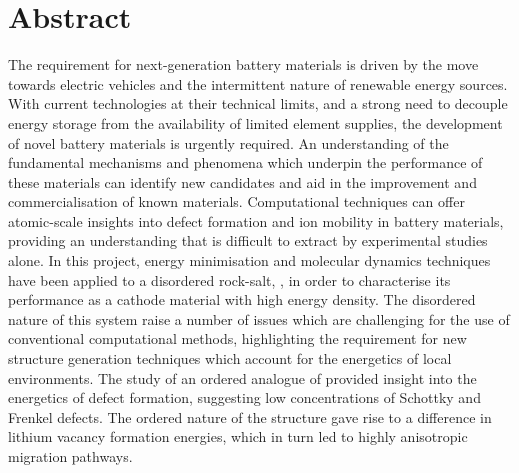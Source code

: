 \chapter*{Abstract}
The requirement for next-generation battery materials is driven by the move towards electric vehicles and the intermittent nature of renewable energy sources.
With current technologies at their technical limits, and a strong need to decouple energy storage from the availability of limited element supplies, the development of novel battery materials is urgently required.
An understanding of the fundamental mechanisms and phenomena which underpin the performance of these materials can identify new candidates and aid in the improvement and commercialisation of known materials.
Computational techniques can offer atomic-scale insights into defect formation and ion mobility in battery materials, providing an understanding that is difficult to extract by experimental studies alone.
In this project, energy minimisation and molecular dynamics techniques have been applied to a disordered rock-salt, , in order to characterise its performance as a cathode material with high energy density.
The disordered nature of this system raise a number of issues which are challenging for the use of conventional computational methods, highlighting the requirement for new structure generation techniques which account for the energetics of local environments.
The study of an ordered analogue of  provided insight into the energetics of defect formation, suggesting low concentrations of Schottky and Frenkel defects.
The ordered nature of the structure gave rise to a difference in lithium vacancy formation energies, which in turn led to highly anisotropic migration pathways.
